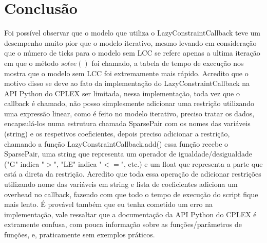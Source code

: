 \documentclass{article}
\begin{document}
    \section{Conclusão}
    Foi possível observar que o modelo que utiliza o LazyConstraintCallback teve um desempenho muito pior que o modelo iterativo,
    mesmo levando em consideração que o número de ticks para o modelo sem LCC se refere apenas a ultima iteração em que o método $solve()$
    foi chamado, a tabela de tempo de execução nos mostra que o modelo sem LCC foi extremamente mais rápido.
    Acredito que o motivo disso se deve ao fato da implementação do LazyConstraintCallback na API Python do CPLEX ser limitada,
    nessa implementação, toda vez que o callback é chamado, não posso simplesmente adicionar uma restrição utilizando uma expressão
    linear, como é feito no modelo iterativo, preciso tratar os dados, encapsulá-los numa estrutura chamada SparsePair com os nomes
    das variáveis (string) e os respetivos coeficientes, depois preciso adicionar a restrição, chamando a função LazyConstraintCallback.add()
    essa função recebe o SparsePair, uma string que representa um operador de igualdade/desigualdade ("G" indica "$>$", "LE" indica "$<=$", etc.)
    e um float que representa a parte que está a direta da restrição.
    Acredito que toda essa operação de adicionar restrições utilizando nome das variáveis em string e lista de coeficientes adiciona um overhead
    no callback, fazendo com que todo o tempo de execução do script fique mais lento.
    É provável também que eu tenha cometido um erro na implementação, vale ressaltar que a documentação da API Python do CPLEX é extramente confusa,
    com pouca informação sobre as funções/parâmetros de funções, e, praticamente sem exemplos práticos.
\end{document}
